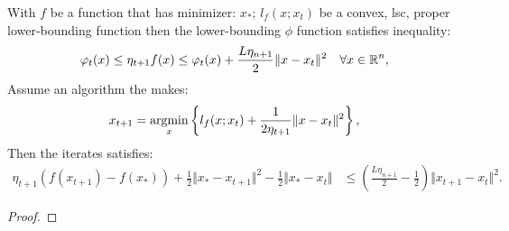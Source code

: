 \documentclass[12pt]{article}
\begin{document}
    \begin{theorem}\label{thm:lower_approx_ppm_convergence}
        With $f$ be a function that has minimizer: $x_*$; $l_f(x; x_t)$ be a convex, lsc, proper lower-bounding function then the lower-bounding $\phi$ function satisfies inequality: 
        $$
        \varphi_t(x) \le \eta_{t + 1}f(x) \le \varphi_t(x) + \frac{L\eta_{n + 1}}{2}\Vert x - x_t\Vert^2 \quad \forall x \in \mathbb R^n, 
        $$ 
        Assume an algorithm the makes: 
        $$
        \begin{aligned}
            x_{t +1} = \mathop{\rm argmin}\limits_{x} \left\lbrace
                l_f(x; x_t) + \frac{1}{2\eta_{t + 1}}\Vert x - x_t\Vert^2
            \right\rbrace, 
        \end{aligned}
        $$
        Then the iterates satisfies: 
        $$
        \begin{aligned}
            \eta_{t + 1}(f(x_{t + 1}) - f(x_*)) + \frac{1}{2}\Vert x_* - x_{t + 1}\Vert^2
            - \frac{1}{2}\Vert x_* - x_t\Vert 
            & \le 
            \left(
                \frac{L \eta_{n + 1}}{2} - \frac{1}{2}
            \right)\Vert x_{t + 1} - x_t\Vert^2.
        \end{aligned}
        $$
    \end{theorem}
    \begin{proof}
        
    \end{proof}



\end{document}
